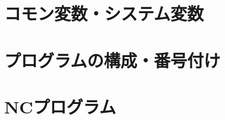 \begin{appendices}
\chapter{コモン変数・システム変数}





\chapter{プログラムの構成・番号付け}





%




%




\chapter{NCプログラム}



\end{appendices}




